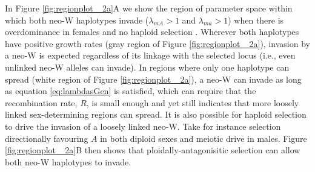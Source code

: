 \documentclass[12pt]{article}
\begin{document}
In Figure \ref{fig:regionplot_ 2a}A we show the region of parameter space within which both neo-W haplotypes invade ($\lambda_{mA}>1$ and $\lambda_{ma}>1$) when there is overdominance in females and no haploid selection \citep[corresponding to Figure 2a in][]{Otto2014}. 
Wherever both haplotypes have positive growth rates (gray region of Figure \ref{fig:regionplot_ 2a}), invasion by a neo-W is expected regardless of its linkage with the selected locus (i.e., even unlinked neo-W alleles can invade). 
In regions where only one haplotype can spread (white region of Figure \ref{fig:regionplot_ 2a}), a neo-W can invade as long as equation \eqref{eq:lambdasGen} is satisfied, which can require that the recombination rate, $R$, is small enough and yet still indicates that more loosely linked sex-determining regions can spread.
It is also possible for haploid selection to drive the invasion of a loosely linked neo-W. 
Take for instance selection directionally favouring $A$ in both diploid sexes and meiotic drive in males.
Figure \ref{fig:regionplot_ 2a}B then shows that ploidally-antagonisitic selection can allow both neo-W haplotypes to invade. 

\end{document}
